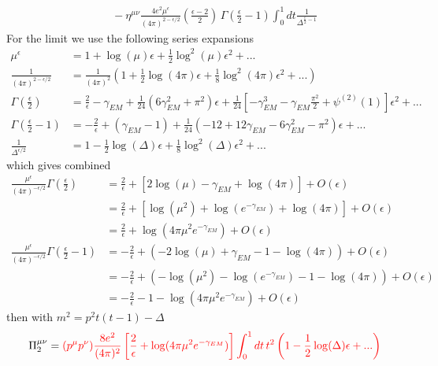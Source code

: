 \documentclass[10pt,a4paper]{article}
\theoremstyle{definition}
\begin{document}
\begin{enumerate}[1.]
\begin{enumerate}[1.)]
\begin{align}
&\quad-\eta^{\mu\nu}\frac{4e^2\mu^\epsilon}{(4\pi)^{{2-\epsilon}/2}}\left(\frac{\epsilon-2}{2}\right)\,\Gamma\left(\frac{\epsilon}{2}-1\right)\int_0^1 dt \frac{1}{\Delta^{\frac{\epsilon}{2}-1}}
\end{align}
For the limit we use the following series expansions
\begin{align}
\mu^\epsilon&=1+ \log(\mu)\epsilon +\frac{1}{2}\log^2(\mu )\epsilon^2+...\\
\frac{1}{(4\pi)^{2-\epsilon/2}}
&=\frac{1}{(4\pi)^2}\left(1+\frac{1}{2}\log (4\pi)\epsilon+\frac{1}{8}\log^2(4\pi) \epsilon^2+...\right)\\
\Gamma\left(\frac{\epsilon}{2}\right)
&=\frac{2}{\epsilon}-\gamma_{EM}+\frac{1}{24}(6\gamma_{EM}^2+\pi^2)\epsilon+\frac{1}{24}[-\gamma_{EM}^3-\gamma_{EM}\frac{\pi^2}{2}+\psi^{(2)}(1)]\epsilon^2+...\\
\Gamma\left(\frac{\epsilon}{2}-1\right)
&=-\frac{2}{\epsilon }+(\gamma_{EM} -1)+\frac{1}{24} \left(-12+12 \gamma_{EM} -6 \gamma_{EM}^2-\pi^2\right) \epsilon +...\\
\frac{1}{\Delta^{\epsilon/2}}&=1-\frac{1}{2}\log(\Delta)\epsilon+\frac{1}{8}\log^2(\Delta)\epsilon^2+...
\end{align}
which gives combined
\begin{align}
\frac{\mu^\epsilon}{(4\pi)^{-\epsilon/2}}\Gamma\left(\frac{\epsilon}{2}\right)
&=\frac{2}{\epsilon }+[2\log(\mu )-\gamma_{EM} +\log (4\pi)]+O\left(\epsilon \right)\\
&=\frac{2}{\epsilon }+[\log(\mu^2)+\log(e^{-\gamma_{EM}}) +\log (4\pi)]+O\left(\epsilon \right)\\
&=\frac{2}{\epsilon }+\log(4\pi\mu^2e^{-\gamma_{EM}})+O\left(\epsilon \right)\\
\frac{\mu^\epsilon}{(4\pi)^{-\epsilon/2}}\Gamma\left(\frac{\epsilon}{2}-1\right)
&=-\frac{2}{\epsilon }+(-2 \log (\mu )+\gamma_{EM} -1-\log (4 \pi ))+O\left(\epsilon \right)\\
&=-\frac{2}{\epsilon }+(-\log (\mu^2)-\log(e^{-\gamma_{EM}})-1-\log (4 \pi))+O\left(\epsilon \right)\\
&=-\frac{2}{\epsilon }-1-\log (4\pi\mu^2e^{-\gamma_{EM}})+O\left(\epsilon \right)
\end{align}
then with $m^2=p^2t(t-1)-\Delta$
\begin{align}
\Pi_2^{\mu\nu}
&=\textcolor{red}{(p^\mu p^\nu)\frac{8e^2}{(4\pi)^2}\left[\frac{2}{\epsilon }+\log(4\pi\mu^2e^{-\gamma_{EM}})\right]\int_0^1dt\,t^2\left(1-\frac{1}{2}\log(\Delta)\epsilon+...\right)}\\

\end{align}
\end{enumerate}
\end{enumerate}
\end{document}
